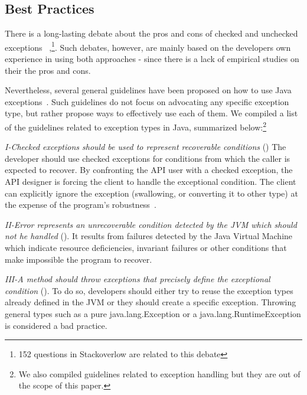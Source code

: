 \documentclass[conference]{IEEEtran}
\begin{document}
\subsection{Best Practices}
\label{sec:best}

There is a long-lasting debate about the pros and cons of checked and unchecked exceptions 
~\cite{javatut,stackoverlow,debate},\footnote{152 questions in Stackoverlow
are related to this debate}. Such debates, however, are mainly based on the developers own experience in
using both approaches - since there is a lack of empirical studies on their the pros and cons.

Nevertheless, several general guidelines have been proposed on how to use Java
exceptions~\cite{mandrioli1992advances,gosling2000java,wirfs2006toward,
bloch2008effective}. Such guidelines do not focus on 
advocating any specific exception type, but rather propose ways to effectively use each of them.
 We compiled a list of the guidelines related to exception types in Java, 
summarized below:\footnote{We also compiled guidelines related
to exception handling but they are out of the scope of this paper.}


\emph{I-Checked exceptions should be used to represent recoverable
conditions} (\cite{mandrioli1992advances,gosling2000java,wirfs2006toward,bloch2008effective})
The developer should use checked exceptions for conditions from which the caller
is expected to recover. By confronting the API user with a checked exception,
the API designer is forcing the client to handle the exceptional condition. The
client can explicitly ignore the exception (swallowing, or converting it to
other type) at the expense of the program's robustness~\cite{gosling2000java}.

\emph{II-Error represents an unrecoverable condition detected by the JVM which
should not he handled} (\cite{gosling2000java}). It results from failures detected
by the Java Virtual Machine which indicate resource deficiencies, invariant
failures or other conditions that make impossible the program to recover.


\emph{III-A method should throw exceptions that precisely define the
exceptional condition} (\cite{gosling2000java,bloch2008effective}). To do so,
developers should either try to reuse the exception types already defined in the
JVM or they should create a specific exception. Throwing general types such as a
pure java.lang.Exception or a java.lang.RuntimeException is considered a bad practice.
\end{document}
